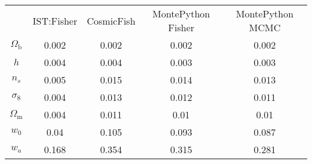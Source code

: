 \begin{table}
\centering
\begin{tabular}{|c|c|c|c|c|}
 & IST:Fisher & CosmicFish & MontePython Fisher & MontePython MCMC \\
$\Omega_\mathrm{b}$ & 0.002 & 0.002 & 0.002 & 0.002 \\
$h$ & 0.004 & 0.004 & 0.003 & 0.003 \\
$n_s$ & 0.005 & 0.015 & 0.014 & 0.013 \\
$\sigma_8$ & 0.004 & 0.013 & 0.012 & 0.011 \\
$\Omega_\mathrm{m}$ & 0.004 & 0.011 & 0.01 & 0.01 \\
$w_0$ & 0.04 & 0.105 & 0.093 & 0.087 \\
$w_a$ & 0.168 & 0.354 & 0.315 & 0.281 \\
\end{tabular}
\end{table}
